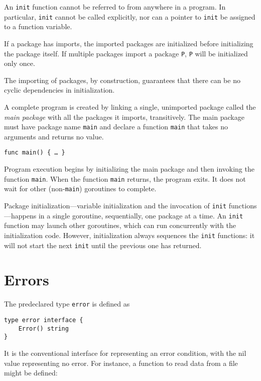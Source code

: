 {An \texttt{init} function cannot be referred to from anywhere in a
program. In particular, \texttt{init} cannot be called explicitly, nor
can a pointer to \texttt{init} be assigned to a function variable.

If a package has imports, the imported packages are initialized before
initializing the package itself. If multiple packages import a package
\texttt{P}, \texttt{P} will be initialized only once.

The importing of packages, by construction, guarantees that there can be
no cyclic dependencies in initialization.

A complete program is created by linking a single, unimported package
called the \emph{main package} with all the packages it imports,
transitively. The main package must have package name \texttt{main} and
declare a function \texttt{main} that takes no arguments and returns no
value.

\begin{Verbatim}[frame=single]
func main() { … }
\end{Verbatim}

Program execution begins by initializing the main package and then
invoking the function \texttt{main}. When the function \texttt{main}
returns, the program exits. It does not wait for other
(non-\texttt{main}) goroutines to complete.

Package initialization---variable initialization and the invocation of
\texttt{init} functions---happens in a single goroutine, sequentially,
one package at a time. An \texttt{init} function may launch other
goroutines, which can run concurrently with the initialization code.
However, initialization always sequences the \texttt{init} functions: it
will not start the next \texttt{init} until the previous one has
returned.

\section*{Errors}

The predeclared type \texttt{error} is defined as

\begin{Verbatim}[frame=single]
type error interface {
    Error() string
}
\end{Verbatim}

It is the conventional interface for representing an error condition,
with the nil value representing no error. For instance, a function to
read data from a file might be defined:

}

